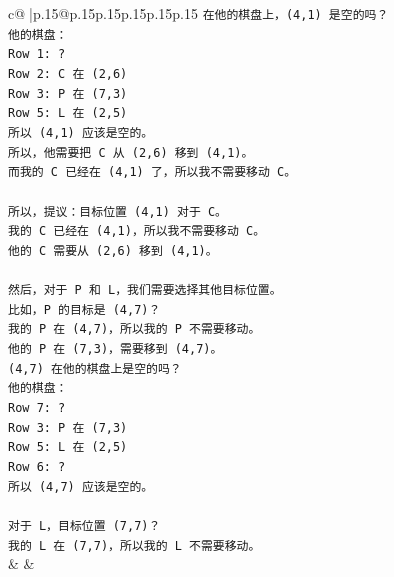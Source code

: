 \documentclass{article}
\begin{document}
{\begin{supertabular}{c@{$\;$}|p{.15\linewidth}@{}p{.15\linewidth}p{.15\linewidth}p{.15\linewidth}p{.15\linewidth}p{.15\linewidth}}
{{{\texttt{在他的棋盘上，(4,1) 是空的吗？} \\
\texttt{他的棋盘：} \\
\texttt{Row 1: ?} \\
\texttt{Row 2: C 在 (2,6)} \\
\texttt{Row 3: P 在 (7,3)} \\
\texttt{Row 5: L 在 (2,5)} \\
\texttt{所以 (4,1) 应该是空的。} \\
\texttt{所以，他需要把 C 从 (2,6) 移到 (4,1)。} \\
\texttt{而我的 C 已经在 (4,1) 了，所以我不需要移动 C。} \\
\\ 
\texttt{所以，提议：目标位置 (4,1) 对于 C。} \\
\texttt{我的 C 已经在 (4,1)，所以我不需要移动 C。} \\
\texttt{他的 C 需要从 (2,6) 移到 (4,1)。} \\
\\ 
\texttt{然后，对于 P 和 L，我们需要选择其他目标位置。} \\
\texttt{比如，P 的目标是 (4,7)？} \\
\texttt{我的 P 在 (4,7)，所以我的 P 不需要移动。} \\
\texttt{他的 P 在 (7,3)，需要移到 (4,7)。} \\
\texttt{(4,7) 在他的棋盘上是空的吗？} \\
\texttt{他的棋盘：} \\
\texttt{Row 7: ?} \\
\texttt{Row 3: P 在 (7,3)} \\
\texttt{Row 5: L 在 (2,5)} \\
\texttt{Row 6: ?} \\
\texttt{所以 (4,7) 应该是空的。} \\
\\ 
\texttt{对于 L，目标位置 (7,7)？} \\
\texttt{我的 L 在 (7,7)，所以我的 L 不需要移动。} \\
            }
        }
    }
    & & \\ \\


\end{supertabular}}
\end{document}

